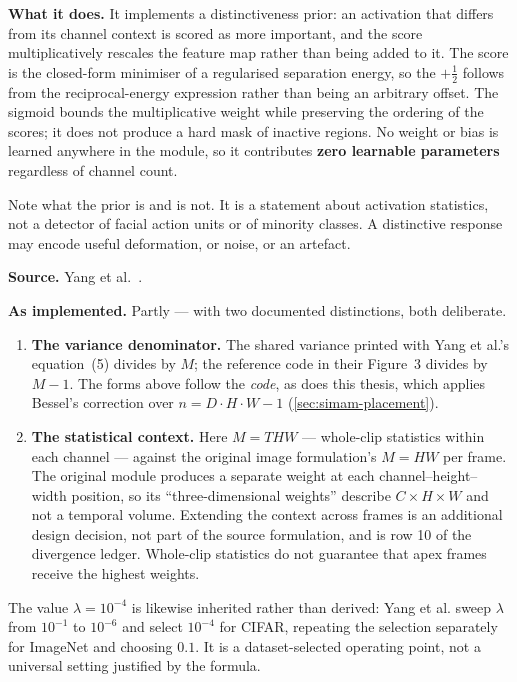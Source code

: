 \textbf{What it does.} It implements a distinctiveness prior: an activation
that differs from its channel context is scored as more important, and the
score multiplicatively rescales the feature map rather than being added to it.
The score is the closed-form minimiser of a regularised separation energy, so
the $+\tfrac{1}{2}$ follows from the reciprocal-energy expression rather than
being an arbitrary offset. The sigmoid bounds the multiplicative weight while
preserving the ordering of the scores; it does not produce a hard mask of
inactive regions. No weight or bias is learned anywhere in the module, so it
contributes \textbf{zero learnable parameters} regardless of channel count.

Note what the prior is and is not. It is a statement about activation
statistics, not a detector of facial action units or of minority classes. A
distinctive response may encode useful deformation, or noise, or an artefact.

\textbf{Source.} Yang et al.~\cite{yang2021}.

\textbf{As implemented.} Partly --- with two documented distinctions, both
deliberate.

\begin{enumerate}
	\item \textbf{The variance denominator.} The shared variance printed with
	Yang et al.'s equation~(5) divides by $M$; the reference code in their
	Figure~3 divides by $M-1$. The forms above follow the \emph{code}, as does
	this thesis, which applies Bessel's correction over $n = D \cdot H \cdot W
	- 1$ (\autoref{sec:simam-placement}).
	\item \textbf{The statistical context.} Here $M = THW$ --- whole-clip
	statistics within each channel --- against the original image
	formulation's $M = HW$ per frame. The original module produces a separate
	weight at each channel--height--width position, so its ``three-dimensional
	weights'' describe $C \times H \times W$ and not a temporal volume.
	Extending the context across frames is an additional design decision, not
	part of the source formulation, and is row 10 of the divergence ledger.
	Whole-clip statistics do not guarantee that apex frames receive the
	highest weights.
\end{enumerate}

The value $\lambda = 10^{-4}$ is likewise inherited rather than derived: Yang
et al. sweep $\lambda$ from $10^{-1}$ to $10^{-6}$ and select $10^{-4}$ for
CIFAR, repeating the selection separately for ImageNet and choosing $0.1$. It
is a dataset-selected operating point, not a universal setting justified by
the formula.

